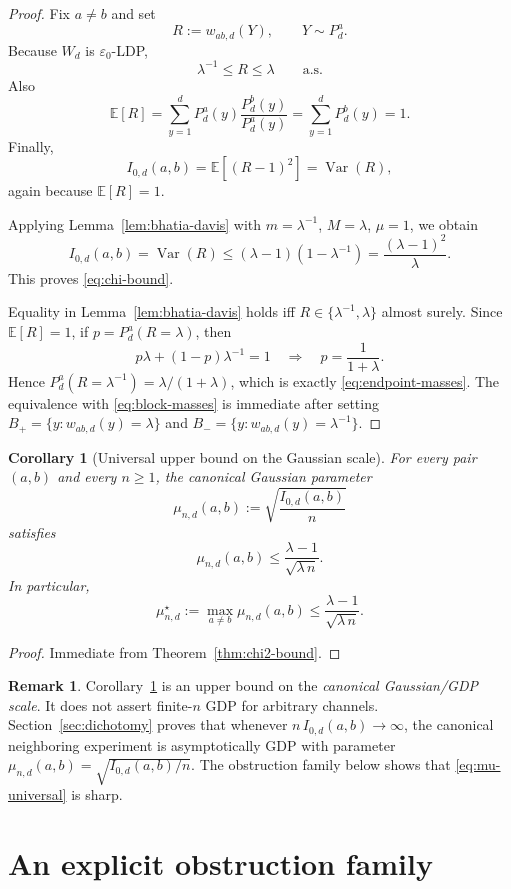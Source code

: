 \documentclass[11pt]{amsart}
\numberwithin{equation}{section}
\newtheorem{corollary}[theorem]{Corollary}
\theoremstyle{definition}
\newtheorem{remark}[theorem]{Remark}
\newcommand{\E}{\mathbb E}
\DeclareMathOperator{\Var}{Var}
\begin{document}
\begin{proof}
Fix $a\neq b$ and set
\[
R:=w_{ab,d}(Y), \qquad Y\sim P_d^a.
\]
Because $W_d$ is $\varepsilon_0$-LDP,
\[
\lambda^{-1}\le R\le \lambda \qquad \text{a.s.}
\]
Also
\[
\E[R]=\sum_{y=1}^d P_d^a(y)\frac{P_d^b(y)}{P_d^a(y)}
=\sum_{y=1}^d P_d^b(y)=1.
\]
Finally,
\[
I_{0,d}(a,b)
=
\E[(R-1)^2]
=
\Var(R),
\]
again because $\E[R]=1$.

Applying Lemma~\ref{lem:bhatia-davis} with
\(
m=\lambda^{-1}
\),
\(
M=\lambda
\),
\(
\mu=1
\),
we obtain
\[
I_{0,d}(a,b)=\Var(R)\le (\lambda-1)(1-\lambda^{-1})
=\frac{(\lambda-1)^2}{\lambda}.
\]
This proves \eqref{eq:chi-bound}.

Equality in Lemma~\ref{lem:bhatia-davis} holds iff $R\in\{\lambda^{-1},\lambda\}$ almost surely.
Since $\E[R]=1$, if
\(
p=P_d^a(R=\lambda)
\),
then
\[
p\lambda +(1-p)\lambda^{-1}=1
\quad\Longrightarrow\quad
p=\frac{1}{1+\lambda}.
\]
Hence
\(
P_d^a(R=\lambda^{-1})=\lambda/(1+\lambda)
\),
which is exactly \eqref{eq:endpoint-masses}.  The equivalence with \eqref{eq:block-masses}
is immediate after setting
\(
B_+=\{y:w_{ab,d}(y)=\lambda\}
\)
and
\(
B_-=\{y:w_{ab,d}(y)=\lambda^{-1}\}
\).
\end{proof}

\begin{corollary}[Universal upper bound on the Gaussian scale]\label{cor:mu-bound}
For every pair $(a,b)$ and every $n\ge1$, the canonical Gaussian parameter
\[
\mu_{n,d}(a,b):=\sqrt{\frac{I_{0,d}(a,b)}{n}}
\]
satisfies
\[
\mu_{n,d}(a,b)\le \frac{\lambda-1}{\sqrt{\lambda\,n}}. \tag{4.5}\label{eq:mu-universal}
\]
In particular,
\[
\mu_{n,d}^\star:=\max_{a\neq b}\mu_{n,d}(a,b)
\le \frac{\lambda-1}{\sqrt{\lambda\,n}}.
\]
\end{corollary}

\begin{proof}
Immediate from Theorem~\ref{thm:chi2-bound}.
\end{proof}

\begin{remark}
Corollary~\ref{cor:mu-bound} is an upper bound on the \emph{canonical Gaussian/GDP scale}.
It does not assert finite-$n$ GDP for arbitrary channels.
Section~\ref{sec:dichotomy} proves that whenever
\( n\,I_{0,d}(a,b)\to\infty \),
the canonical neighboring experiment is asymptotically GDP with parameter
\(
\mu_{n,d}(a,b)=\sqrt{I_{0,d}(a,b)/n}
\).
The obstruction family below shows that \eqref{eq:mu-universal} is sharp.
\end{remark}

\section{An explicit obstruction family}
\end{document}
